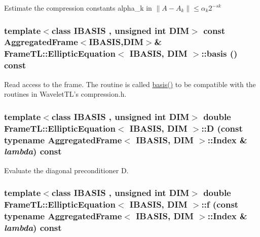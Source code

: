 Estimate the compression constants alpha\_\-k in $\|A-A_k\| \leq \alpha_k 2^{-sk}$ \hypertarget{classFrameTL_1_1EllipticEquation_f3c3552134fe3d41c4d4d00b13130381}{
\subsubsection[{basis}]{\setlength{\rightskip}{0pt plus 5cm}template$<$class IBASIS , unsigned int DIM$>$ const {\bf AggregatedFrame}$<$IBASIS,DIM$>$\& {\bf FrameTL::EllipticEquation}$<$ IBASIS, DIM $>$::basis () const}}
\label{classFrameTL_1_1EllipticEquation_f3c3552134fe3d41c4d4d00b13130381}


Read access to the frame. The routine is called \hyperlink{classFrameTL_1_1EllipticEquation_f3c3552134fe3d41c4d4d00b13130381}{basis()} to be compatible with the routines in WaveletTL's compression.h. \hypertarget{classFrameTL_1_1EllipticEquation_f7c320c54b0fb68c152af4cad0ef1848}{
\subsubsection[{D}]{\setlength{\rightskip}{0pt plus 5cm}template$<$class IBASIS , unsigned int DIM$>$ double {\bf FrameTL::EllipticEquation}$<$ IBASIS, DIM $>$::D (const typename {\bf AggregatedFrame}$<$ IBASIS, DIM $>$::{\bf Index} \& {\em lambda}) const}}
\label{classFrameTL_1_1EllipticEquation_f7c320c54b0fb68c152af4cad0ef1848}


Evaluate the diagonal preconditioner D. \hypertarget{classFrameTL_1_1EllipticEquation_cf749ff770cf529266c1272bca4bc184}{
\subsubsection[{f}]{\setlength{\rightskip}{0pt plus 5cm}template$<$class IBASIS , unsigned int DIM$>$ double {\bf FrameTL::EllipticEquation}$<$ IBASIS, DIM $>$::f (const typename {\bf AggregatedFrame}$<$ IBASIS, DIM $>$::{\bf Index} \& {\em lambda}) const}}
\label{classFrameTL_1_1EllipticEquation_cf749ff770cf529266c1272bca4bc184}


